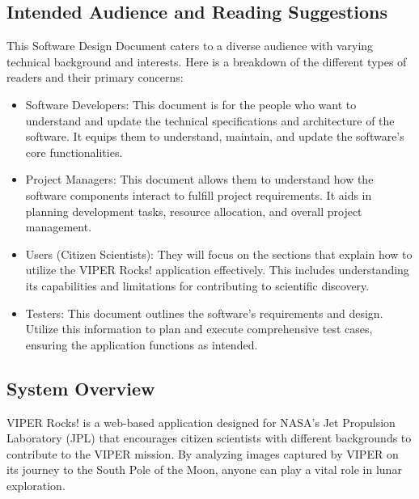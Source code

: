 \documentclass{article}
\begin{document}
\subsection{Intended Audience and Reading Suggestions}
This Software Design Document caters to a diverse audience with varying technical background and interests. Here is a breakdown of the different types of readers and their primary concerns:
\begin{itemize}
	\item Software Developers: This document is for the people who want to understand and update the technical specifications and architecture of the software. It equips them to understand, maintain, and update the software’s core functionalities.
	\item Project Managers: This document allows them to understand how the software components interact to fulfill project requirements. It aids in planning development tasks, resource allocation, and overall project management.
	\item Users (Citizen Scientists): They will focus on the sections that explain how to utilize the VIPER Rocks! application effectively. This includes understanding its capabilities and limitations for contributing to scientific discovery.
	\item Testers: This document outlines the software’s requirements and design. Utilize this information to plan and execute comprehensive test cases, ensuring the application functions as intended.
\end{itemize}
 
\subsection{System Overview}
VIPER Rocks! is a web-based application designed for NASA’s Jet Propulsion Laboratory (JPL) that encourages citizen scientists with different backgrounds to contribute to the VIPER mission. By analyzing images captured by VIPER on its journey to the South Pole of the Moon, anyone can play a vital role in lunar exploration.
\end{document}
